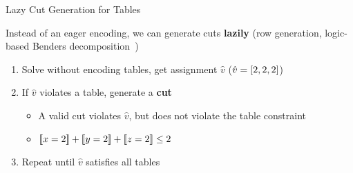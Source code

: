 \documentclass[aspectratio=169]{beamer}
\begin{document}
\begin{frame}{Lazy Cut Generation for Tables}

Instead of an eager encoding, we can generate cuts \textbf{lazily} (\ie row generation, logic-based Benders decomposition~\cite{DBLP:journals/ior/Hooker07})

\begin{enumerate}
	\item<2-> Solve without encoding tables, get assignment $\hat{v}$ (\eg $\hat{v} = [2,2,2]$)
	\item<3-> If $\hat{v}$ violates a table, generate a \textbf{cut}
		\begin{itemize}
			\item A valid cut violates $\hat{v}$, but does not violate the table constraint
			\item \Eg $\be{1}{2} + \be{2}{2} + \be{3}{2} \leq 2$
		\end{itemize}
    \item<4-> Repeat until $\hat{v}$ satisfies all tables
\end{enumerate}

\vfill
{}

\vfill
{}



%
\end{frame}
\end{document}
